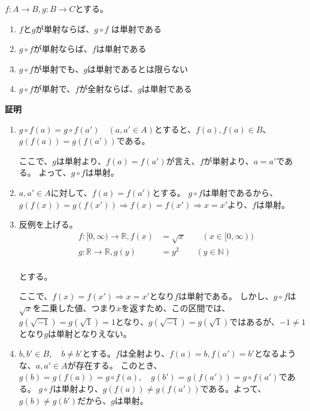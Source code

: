 \documentclass[dvipdfmx,autodetect-engine]{jsarticle}
\begin{document}
 $f:A \to B, g: B \to C$とする。

\begin{enumerate}
\renewcommand{\labelenumi}{(\arabic{enumi})}
	\item $f$と$g$が単射ならば、$g \circ f$ は単射である
	\item $g \circ f$が単射ならば、$f$は単射である
	\item $g \circ f$が単射でも、$g$は単射であるとは限らない
	\item $g \circ f$が単射で、$f$が全射ならば、$g$は単射である
\end{enumerate}

{\bf 証明}

\begin{enumerate}
\renewcommand{\labelenumi}{(\arabic{enumi})}
	\item $g \circ f(a) = g \circ f(a') \quad (a, a' \in A)$とすると、$f(a), f(a) \in B$、$g(f(a))　= g(f(a'))$である。
	
	ここで、$g$は単射より、$f(a) = f(a')$が言え、$f$が単射より、$a = a'$である。
	よって、$g \circ f$は単射。
	
	\item $a,a' \in A$に対して、$f(a) = f(a')$とする。
	$g \circ f$は単射であるから、$g(f(x)) = g(f(x')) \Rightarrow f(x) = f(x') \Rightarrow x = x'$より、$f$は単射。

    \item 反例を上げる。
    \begin{eqnarray*}
    &f:[0,∞) \to \mathbb{R}, f(x) &= \sqrt{x} \quad \quad (x \in [0,∞)) \\
    &g:\mathbb{R} \to \mathbb{R}, g(y) &= y^2  \quad \quad (y \in \mathbb{N}) \\
    \end{eqnarray*}
    
    とする。
    
    ここで、$f(x) = f(x') \Rightarrow x = x'$となり$f$は単射である。
    しかし、$g \circ f$は$\sqrt{x}$を二乗した値、つまり$x$を返すため、この区間では、$g(\sqrt{-1}) = g(\sqrt{1}) = 1$となり、$g(\sqrt{-1}) = g(\sqrt{1})$ではあるが、$-1 \neq 1$となり$g$は単射となりえない。
    
    \item $b, b' \in B, \quad b \neq b'$とする。$f$は全射より、$f(a) = b, f(a') = b'$となるような、$a, a' \in A$が存在する。
    このとき、$g(b) = g(f(a)) = g \circ f(a), \quad g(b') = g(f(a')) = g \circ f(a')$である。
    $g \circ f$は単射より、$g(f(a)) \neq g(f(a'))$である。よって、$g(b) \neq g(b')$だから、$g$は単射。
	
\end{enumerate}
\end{document}
